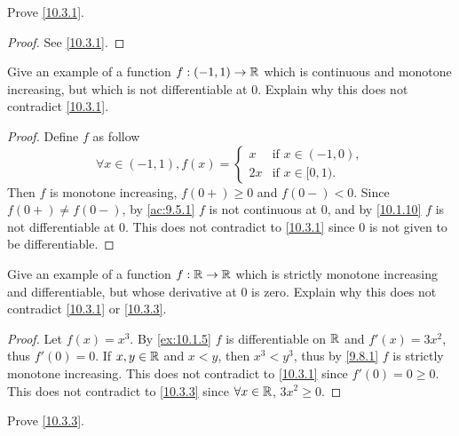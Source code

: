 \exercisesection

\begin{ex}\label{ex:10.3.1}
  Prove \cref{10.3.1}.
\end{ex}

\begin{proof}
  See \cref{10.3.1}.
\end{proof}

\begin{ex}\label{ex:10.3.2}
  Give an example of a function \(f : (-1, 1) \to \mathbb{R}\) which is continuous and monotone increasing, but which is not differentiable at \(0\).
  Explain why this does not contradict \cref{10.3.1}.
\end{ex}

\begin{proof}
  Define \(f\) as follow
  \[
    \forall x \in (-1, 1), f(x) = \begin{cases}
      x  & \text{if } x \in (-1, 0), \\
      2x & \text{if } x \in [0, 1).
    \end{cases}
  \]
  Then \(f\) is monotone increasing, \(f(0+) \geq 0\) and \(f(0-) < 0\).
  Since \(f(0+) \neq f(0-)\), by \cref{ac:9.5.1} \(f\) is not continuous at \(0\), and by \cref{10.1.10} \(f\) is not differentiable at \(0\).
  This does not contradict to \cref{10.3.1} since \(0\) is not given to be differentiable.
\end{proof}

\begin{ex}\label{ex:10.3.3}
  Give an example of a function \(f : \mathbb{R} \to \mathbb{R}\) which is strictly monotone increasing and differentiable, but whose derivative at \(0\) is zero.
  Explain why this does not contradict \cref{10.3.1} or \cref{10.3.3}.
\end{ex}

\begin{proof}
  Let \(f(x) = x^3\).
  By \cref{ex:10.1.5} \(f\) is differentiable on \(\mathbb{R}\) and \(f'(x) = 3x^2\), thus \(f'(0) = 0\).
  If \(x, y \in \mathbb{R}\) and \(x < y\), then \(x^3 < y^3\), thus by \cref{9.8.1} \(f\) is strictly monotone increasing.
  This does not contradict to \cref{10.3.1} since \(f'(0) = 0 \geq 0\).
  This does not contradict to \cref{10.3.3} since \(\forall x \in \mathbb{R}\), \(3x^2 \geq 0\).
\end{proof}

\begin{ex}\label{ex:10.3.4}
  Prove \cref{10.3.3}.
\end{ex}

